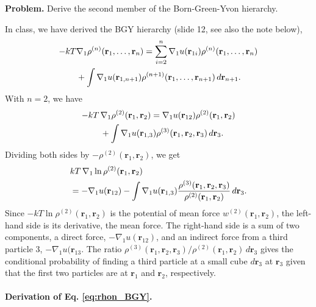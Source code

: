 \documentclass[twocolumn, 10pt]{article}
\numberwithin{equation}{section}
\newenvironment{problem}
{\par\medskip \color{problue}
  \textbf{Problem. }\ignorespaces}
{\medskip}
\newenvironment{solution}[1][\empty]
{\par\medskip\sffamily
  \textbf{\ifx\empty#1{Solution.}\relax\else{#1}\fi} \ignorespaces}
{\medskip}
\begin{document}
\begin{problem}
  Derive the second member of the Born-Green-Yvon hierarchy.
\end{problem}

\begin{solution}
In class, we have derived the BGY hierarchy (slide 12, see also the note below),
\begin{align}
  -kT &\nabla_1\rho^{(n)}(\mathbf r_1, \dots, \mathbf r_n)
  =
  \sum_{i=2}^n \nabla_1 u(\mathbf r_{1i})
  \rho^{(n)}(\mathbf r_1, \dots, \mathbf r_n)
  \notag
  \\
  &+ \int
  \nabla_1 u(\mathbf r_{1, n+1})
  \rho^{(n+1)}(\mathbf r_1, \dots, \mathbf r_{n+1}) \,
  d\mathbf r_{n+1}
  .
  \label{eq:rhon_BGY}
\end{align}
%
With $n = 2$, we have
\begin{align}
  -kT \, & \nabla_1\rho^{(2)}(\mathbf r_1, \mathbf r_2)
  =
  \nabla_1 u(\mathbf r_{12})
  \rho^{(2)}(\mathbf r_1, \mathbf r_2)
  \notag \\
  &+
  \int
  \nabla_1 u(\mathbf r_{1, 3})
  \rho^{(3)}(\mathbf r_1, \mathbf r_2, \mathbf r_{3}) \,
  d\mathbf r_3
  .
  \notag
\end{align}
%
Dividing both sides by $-\rho^{(2)}(\mathbf r_1, \mathbf r_2)$, we get
\begin{align}
  &kT \, \nabla_1 \ln \rho^{(2)}(\mathbf r_1, \mathbf r_2)
  \notag \\
  &=
  -\nabla_1 u(\mathbf r_{12})
  -
  \int
  \nabla_1 u(\mathbf r_{1, 3})
    \frac{
      \rho^{(3)}(\mathbf r_1, \mathbf r_2, \mathbf r_{3})
    }{
      \rho^{(2)}(\mathbf r_1, \mathbf r_2)
    }
    \,
    d\mathbf r_3
  .
  \label{eq:BGY2a}
\end{align}
%
Since $-kT\ln\rho^{(2)}(\mathbf r_1, \mathbf r_2)$
is the potential of mean force
$w^{(2)}(\mathbf r_1, \mathbf r_2)$,
the left-hand side is its derivative, the mean force.
%
The right-hand side is a sum of two components,
a direct force, $-\nabla_1 u(\mathbf r_{12})$,
and an indirect force
from a third particle $3$, $-\nabla_1 u(\mathbf r_{13}$.
%
The ratio
$\rho^{(3)}(\mathbf r_1, \mathbf r_2, \mathbf r_3)/\rho^{(2)}(\mathbf r_1, \mathbf r_2) \, d\mathbf r_3$
gives the conditional probability of finding a third particle at
a small cube $d\mathbf r_3$ at $\mathbf r_3$
given that the first two particles are at $\mathbf r_1$ and $\mathbf r_2$, respectively.


\paragraph*{Derivation of Eq. \eqref{eq:rhon_BGY}.}


\end{solution}
\end{document}
